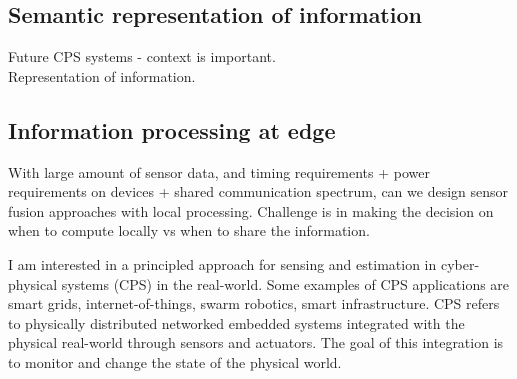 \documentclass[10pt]{article}
\begin{document}
\subsection{Semantic representation of information}
Future CPS systems - context is important. \\

Representation of information.

\subsection{Information processing at edge}
With large amount of sensor data, and timing requirements + power requirements on devices + shared communication spectrum, can we design sensor fusion approaches with local processing. Challenge is in making the decision on when to compute locally vs when to share the information. 



\newpage














I am interested in a principled approach for sensing and estimation in cyber-physical systems (CPS) in the real-world. Some examples of CPS applications are smart grids, internet-of-things, swarm robotics, smart infrastructure.
CPS refers to physically distributed networked embedded systems integrated with the physical real-world through sensors and actuators. The goal of this integration is to monitor and change the state of the physical world. 
\end{document}
